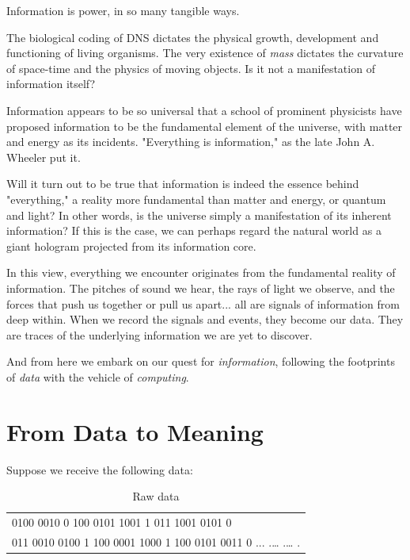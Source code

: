 \documentclass[
  letterpaper,
]{scrbook}
\begin{document}
Information is power, in so many tangible ways.

The biological coding of DNS dictates the physical growth, development
and functioning of living organisms. The very existence of \emph{mass}
dictates the curvature of space-time and the physics of moving objects.
Is it not a manifestation of information itself?

Information appears to be so universal that a school of prominent
physicists have proposed information to be the fundamental element of
the universe, with matter and energy as its incidents. "Everything is
information," as the late John A. Wheeler put it.

Will it turn out to be true that information is indeed the essence
behind "everything," a reality more fundamental than matter and energy,
or quantum and light? In other words, is the universe simply a
manifestation of its inherent information? If this is the case, we can
perhaps regard the natural world as a giant hologram projected from its
information core.

In this view, everything we encounter originates from the fundamental
reality of information. The pitches of sound we hear, the rays of light
we observe, and the forces that push us together or pull us apart... all
are signals of information from deep within. When we record the signals
and events, they become our data. They are traces of the underlying
information we are yet to discover.

And from here we embark on our quest for \emph{information}, following
the footprints of \emph{data} with the vehicle of \emph{computing}.

\section{From Data to Meaning}\label{from-data-to-meaning}

Suppose we receive the following data:

\protect{}\label{tab-data-raw}
\begin{longtable}[]{@{}l@{}}
\caption{Raw data}\tabularnewline
\toprule\noalign{}
\endfirsthead
\endhead
\bottomrule\noalign{}
\endlastfoot
011 0100 0010 0 100 0101 1001 1 011 1001 0101 0 \\
011 0010 0100 1 100 0001 1000 1 100 0101 0011 0 ... .\ldots{} .\ldots{}
. \\
\end{longtable}

\protect{}\label{tab-data-raw}{}
\end{document}

